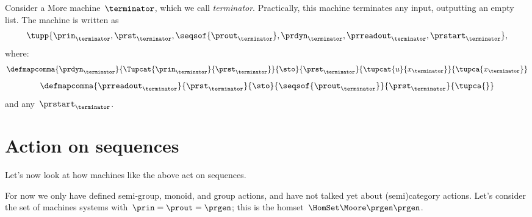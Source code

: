 {{        \begin{example}[Terminator]
            Consider a More machine~$\terminator$, which we call \emph{terminator}.
            Practically, this machine terminates any input, outputting an empty list.
            The machine is written as
            \begin{equation*}
                \tupp{\prin_{\terminator},\prst_{\terminator},\seqsof{\prout_{\terminator}},\prdyn_{\terminator},\prreadout_{\terminator},\prstart_{\terminator}},
            \end{equation*}
            where:
            \begin{equation*}
                \defmapcomma{\prdyn_\terminator}
                {\Tupcat{\prin_\terminator}{\prst_\terminator}}
                {\sto}
                {\prst_\terminator}
                {\tupcat{u}{x_\terminator}}
                {\tupca{x_\terminator}}
            \end{equation*}
            \begin{equation*}
                \defmapcomma{\prreadout_\terminator}
                {\prst_\terminator}
                {\sto}
                {\seqsof{\prout_\terminator}}
                {\prst_\terminator}
                {
                    \tupca{}
                }
            \end{equation*}
            and any~$\prstart_\terminator$.
        \end{example}
    }

    }


    \section{Action on sequences}

    Let's now look at how machines like the above act on sequences.

    For now we only have defined semi-group, monoid, and group actions, and have not talked yet about (semi)category actions.
    Let's consider the set of machines systems with~$\prin = \prout = \prgen$; this is the homset~$\HomSet\Moore\prgen\prgen$.

